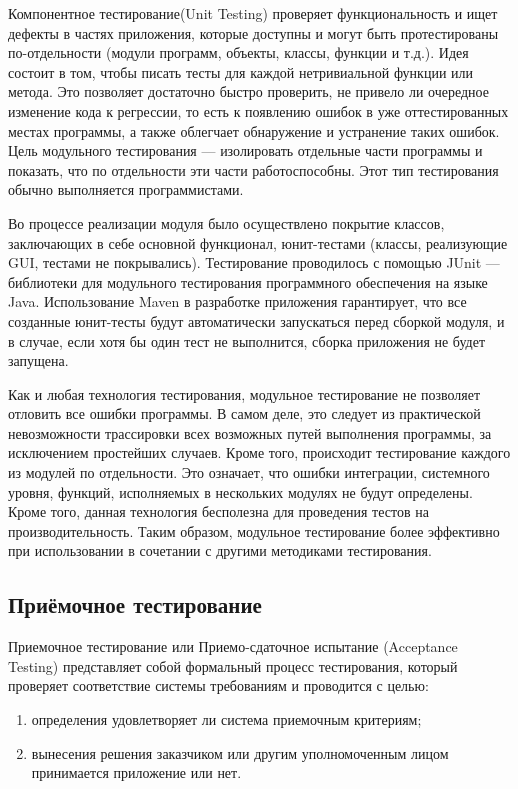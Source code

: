 Компонентное тестирование(Unit Testing) проверяет функциональность и ищет дефекты в частях
приложения, которые доступны и могут быть протестированы по-отдельности (модули программ, объекты, классы, функции
и т.д.)\cite{bek}. Идея состоит в том, чтобы писать тесты для каждой нетривиальной функции или метода. Это позволяет достаточно
быстро проверить, не привело ли очередное изменение кода к регрессии, то есть к появлению ошибок в уже оттестированных
местах программы, а также облегчает обнаружение и устранение таких ошибок. Цель модульного тестирования --- изолировать
отдельные части программы и показать, что по отдельности эти части работоспособны. Этот тип тестирования обычно
выполняется программистами\cite{stress}.

Во процессе реализации модуля было осуществлено покрытие классов, заключающих в себе основной функционал, юнит-тестами
(классы, реализующие GUI, тестами не покрывались). Тестирование проводилось с помощью JUnit ---  библиотеки для
модульного тестирования программного обеспечения на языке Java. Использование Maven в разработке приложения гарантирует,
что все созданные юнит-тесты будут автоматически запускаться перед сборкой модуля, и в случае, если хотя бы один тест не
выполнится, сборка приложения не будет запущена.

Как и любая технология тестирования, модульное тестирование не позволяет отловить все ошибки программы. В самом деле,
это следует из практической невозможности трассировки всех возможных путей выполнения программы, за исключением
простейших случаев. Кроме того, происходит тестирование каждого из модулей по отдельности. Это означает, что ошибки
интеграции, системного уровня, функций, исполняемых в нескольких модулях не будут определены. Кроме того, данная
технология бесполезна для проведения тестов на производительность. Таким образом, модульное тестирование более
эффективно при использовании в сочетании с другими методиками тестирования.

\subsection{Приёмочное тестирование}

Приемочное тестирование или Приемо-сдаточное испытание (Acceptance Testing) представляет собой формальный процесс
тестирования, который проверяет соответствие системы требованиям и проводится с целью:

\begin{enumerate}
\item определения удовлетворяет ли система приемочным критериям;
\item вынесения решения заказчиком или другим уполномоченным лицом принимается приложение или нет.
\end{enumerate}

